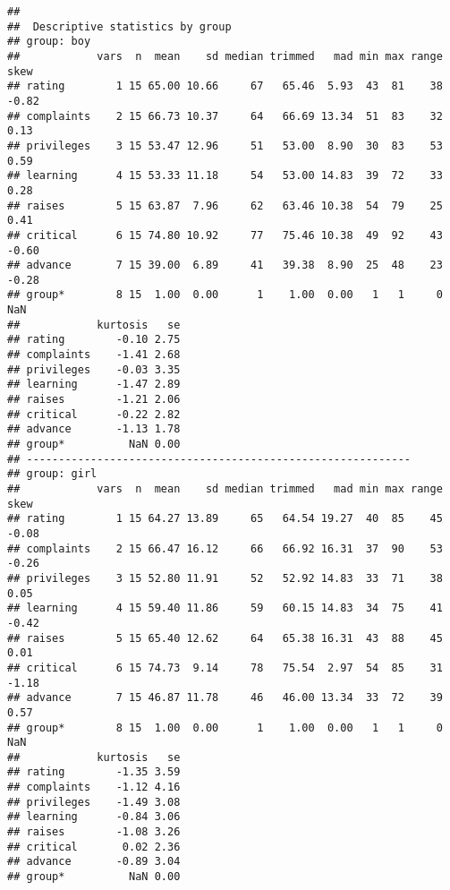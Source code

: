 \documentclass[]{article}
\newenvironment{Shaded}{\begin{snugshade}}{\end{snugshade}}
\newcommand{\KeywordTok}[1]{\textcolor[rgb]{0.13,0.29,0.53}{\textbf{#1}}}
\newcommand{\DecValTok}[1]{\textcolor[rgb]{0.00,0.00,0.81}{#1}}
\newcommand{\StringTok}[1]{\textcolor[rgb]{0.31,0.60,0.02}{#1}}
\newcommand{\ControlFlowTok}[1]{\textcolor[rgb]{0.13,0.29,0.53}{\textbf{#1}}}
\newcommand{\OperatorTok}[1]{\textcolor[rgb]{0.81,0.36,0.00}{\textbf{#1}}}
\newcommand{\NormalTok}[1]{#1}
\begin{document}
\begin{verbatim}
## 
##  Descriptive statistics by group 
## group: boy
##            vars  n  mean    sd median trimmed   mad min max range  skew
## rating        1 15 65.00 10.66     67   65.46  5.93  43  81    38 -0.82
## complaints    2 15 66.73 10.37     64   66.69 13.34  51  83    32  0.13
## privileges    3 15 53.47 12.96     51   53.00  8.90  30  83    53  0.59
## learning      4 15 53.33 11.18     54   53.00 14.83  39  72    33  0.28
## raises        5 15 63.87  7.96     62   63.46 10.38  54  79    25  0.41
## critical      6 15 74.80 10.92     77   75.46 10.38  49  92    43 -0.60
## advance       7 15 39.00  6.89     41   39.38  8.90  25  48    23 -0.28
## group*        8 15  1.00  0.00      1    1.00  0.00   1   1     0   NaN
##            kurtosis   se
## rating        -0.10 2.75
## complaints    -1.41 2.68
## privileges    -0.03 3.35
## learning      -1.47 2.89
## raises        -1.21 2.06
## critical      -0.22 2.82
## advance       -1.13 1.78
## group*          NaN 0.00
## ------------------------------------------------------------ 
## group: girl
##            vars  n  mean    sd median trimmed   mad min max range  skew
## rating        1 15 64.27 13.89     65   64.54 19.27  40  85    45 -0.08
## complaints    2 15 66.47 16.12     66   66.92 16.31  37  90    53 -0.26
## privileges    3 15 52.80 11.91     52   52.92 14.83  33  71    38  0.05
## learning      4 15 59.40 11.86     59   60.15 14.83  34  75    41 -0.42
## raises        5 15 65.40 12.62     64   65.38 16.31  43  88    45  0.01
## critical      6 15 74.73  9.14     78   75.54  2.97  54  85    31 -1.18
## advance       7 15 46.87 11.78     46   46.00 13.34  33  72    39  0.57
## group*        8 15  1.00  0.00      1    1.00  0.00   1   1     0   NaN
##            kurtosis   se
## rating        -1.35 3.59
## complaints    -1.12 4.16
## privileges    -1.49 3.08
## learning      -0.84 3.06
## raises        -1.08 3.26
## critical       0.02 2.36
## advance       -0.89 3.04
## group*          NaN 0.00
\end{verbatim}

\begin{Shaded}
\end{Shaded}
\end{document}
